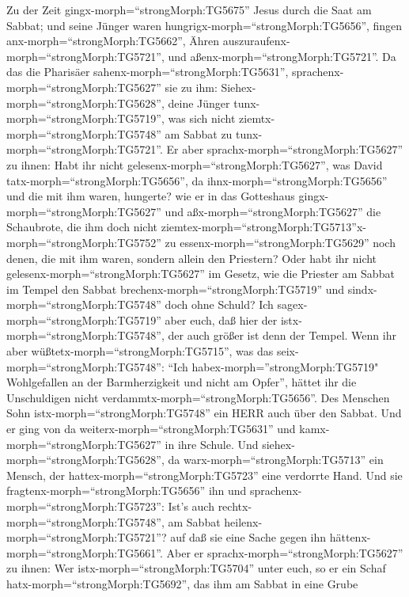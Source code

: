  Zu der Zeit gingx-morph=``strongMorph:TG5675'' Jesus durch
die Saat am Sabbat; und seine Jünger waren
hungrigx-morph=``strongMorph:TG5656'', fingen
anx-morph=``strongMorph:TG5662'', Ähren
auszuraufenx-morph=``strongMorph:TG5721'', und
aßenx-morph=``strongMorph:TG5721''.  Da das die Pharisäer
sahenx-morph=``strongMorph:TG5631'',
sprachenx-morph=``strongMorph:TG5627'' sie zu ihm:
Siehex-morph=``strongMorph:TG5628'', deine Jünger
tunx-morph=``strongMorph:TG5719'', was sich nicht
ziemtx-morph=``strongMorph:TG5748'' am Sabbat zu
tunx-morph=``strongMorph:TG5721''.  Er aber
sprachx-morph=``strongMorph:TG5627'' zu ihnen: Habt ihr nicht
gelesenx-morph=``strongMorph:TG5627'', was David
tatx-morph=``strongMorph:TG5656'', da ihnx-morph=``strongMorph:TG5656''
und die mit ihm waren, hungerte?  wie er in das Gotteshaus
gingx-morph=``strongMorph:TG5627'' und aßx-morph=``strongMorph:TG5627''
die Schaubrote, die ihm doch nicht
ziemtex-morph=``strongMorph:TG5713''x-morph=``strongMorph:TG5752'' zu
essenx-morph=``strongMorph:TG5629'' noch denen, die mit ihm waren,
sondern allein den Priestern?  Oder habt ihr nicht
gelesenx-morph=``strongMorph:TG5627'' im Gesetz, wie die Priester am
Sabbat im Tempel den Sabbat brechenx-morph=``strongMorph:TG5719'' und
sindx-morph=``strongMorph:TG5748'' doch ohne Schuld?  Ich
sagex-morph=``strongMorph:TG5719'' aber euch, daß hier der
istx-morph=``strongMorph:TG5748'', der auch größer ist denn der Tempel.
 Wenn ihr aber wüßtetx-morph=``strongMorph:TG5715'', was das
seix-morph=``strongMorph:TG5748'': ``Ich
habex-morph=''strongMorph:TG5719" Wohlgefallen an der Barmherzigkeit und
nicht am Opfer'', hättet ihr die Unschuldigen nicht
verdammtx-morph=``strongMorph:TG5656''.  Des Menschen Sohn
istx-morph=``strongMorph:TG5748'' ein HERR auch über den Sabbat.
 Und er ging von da weiterx-morph=``strongMorph:TG5631'' und
kamx-morph=``strongMorph:TG5627'' in ihre Schule.  Und
siehex-morph=``strongMorph:TG5628'', da
warx-morph=``strongMorph:TG5713'' ein Mensch, der
hattex-morph=``strongMorph:TG5723'' eine verdorrte Hand. Und sie
fragtenx-morph=``strongMorph:TG5656'' ihn und
sprachenx-morph=``strongMorph:TG5723'': Ist's auch
rechtx-morph=``strongMorph:TG5748'', am Sabbat
heilenx-morph=``strongMorph:TG5721''? auf daß sie eine Sache gegen ihn
hättenx-morph=``strongMorph:TG5661''.  Aber er
sprachx-morph=``strongMorph:TG5627'' zu ihnen: Wer
istx-morph=``strongMorph:TG5704'' unter euch, so er ein Schaf
hatx-morph=``strongMorph:TG5692'', das ihm am Sabbat in eine Grube
